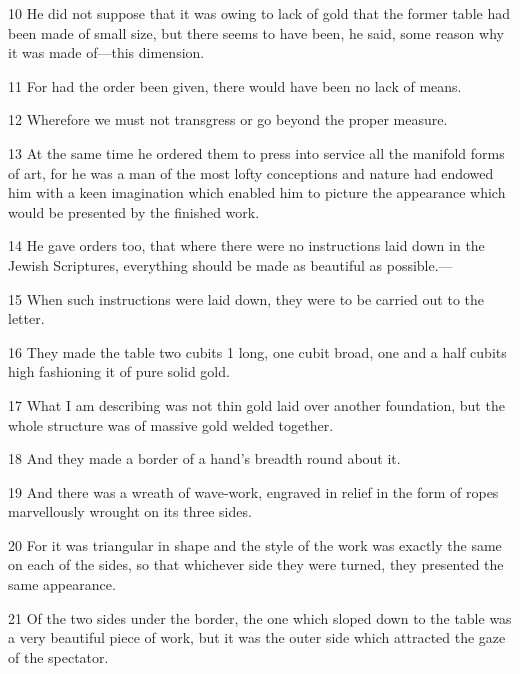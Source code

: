 \par 10 He did not suppose that it was owing to lack of gold that the former table had been made of small size, but there seems to have been, he said, some reason why it was made of—this dimension.

\par 11 For had the order been given, there would have been no lack of means.

\par 12 Wherefore we must not transgress or go beyond the proper measure.

\par 13 At the same time he ordered them to press into service all the manifold forms of art, for he was a man of the most lofty conceptions and nature had endowed him with a keen imagination which enabled him to picture the appearance which would be presented by the finished work.

\par 14 He gave orders too, that where there were no instructions laid down in the Jewish Scriptures, everything should be made as beautiful as possible.—

\par 15 When such instructions were laid down, they were to be carried out to the letter.

\par 16 They made the table two cubits 1 long, one cubit broad, one and a half cubits high fashioning it of pure solid gold.

\par 17 What I am describing was not thin gold laid over another foundation, but the whole structure was of massive gold welded together.

\par 18 And they made a border of a hand's breadth round about it.

\par 19 And there was a wreath of wave-work, engraved in relief in the form of ropes marvellously wrought on its three sides.

\par 20 For it was triangular in shape and the style of the work was exactly the same on each of the sides, so that whichever side they were turned, they presented the same appearance.

\par 21 Of the two sides under the border, the one which sloped down to the table was a very beautiful piece of work, but it was the outer side which attracted the gaze of the spectator.

